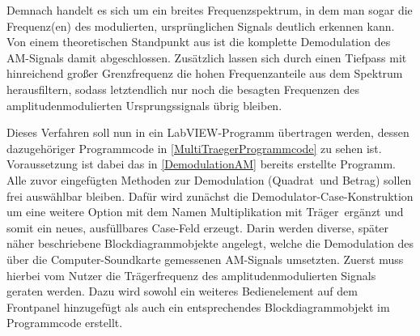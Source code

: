 \documentclass[
a4paper,
12pt,
pagesize,
ngerman
]{scrartcl}
\begin{document}
	\noindent Demnach handelt es sich um ein breites Frequenzspektrum, in dem man sogar die Frequenz(en) des modulierten, ursprünglichen Signals deutlich erkennen kann. 
	Von einem theoretischen Standpunkt aus ist die komplette Demodulation des AM-Signals damit abgeschlossen. 
	Zusätzlich lassen sich durch einen Tiefpass mit hinreichend großer Grenzfrequenz die hohen Frequenzanteile aus dem Spektrum herausfiltern, sodass letztendlich nur noch die besagten Frequenzen des amplitudenmodulierten Ursprungssignals übrig bleiben. 
	
	Dieses Verfahren soll nun in ein LabVIEW-Programm übertragen werden, dessen dazugehöriger Programmcode in \ref{MultiTraegerProgrammcode} zu sehen ist. 
	Voraussetzung ist dabei das in \cref{DemodulationAM} bereits erstellte Programm.
	Alle zuvor eingefügten Methoden zur Demodulation (\glqq Quadrat\grqq\ und \glqq Betrag\grqq ) sollen frei auswählbar bleiben.
	Dafür wird zunächst die Demodulator-Case-Konstruktion um eine weitere Option mit dem Namen \glqq Multiplikation mit Träger\grqq\ ergänzt und somit ein neues, ausfüllbares Case-Feld erzeugt.
	Darin werden diverse, später näher beschriebene Blockdiagrammobjekte angelegt, welche die Demodulation des über die Computer-Soundkarte gemessenen AM-Signals umsetzten.
	Zuerst muss hierbei vom Nutzer die Trägerfrequenz des amplitudenmodulierten Signals geraten werden.
	Dazu wird sowohl ein weiteres Bedienelement auf dem Frontpanel hinzugefügt als auch ein entsprechendes Blockdiagrammobjekt im Programmcode erstellt. %
	
\end{document}
